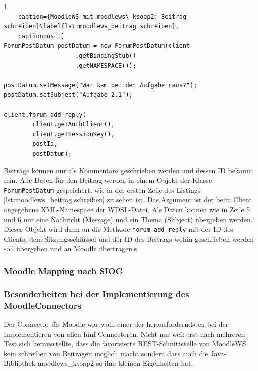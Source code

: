 \begin{lstlisting}[
    caption={MoodleWS mit moodlews\_ksoap2: Beitrag schreiben}\label{lst:moodlews_beitrag schreiben},
    captionpos=t]
ForumPostDatum postDatum = new ForumPostDatum(client
                    .getBindingStub()
                    .getNAMESPACE());

postDatum.setMessage("War kam bei der Aufgabe raus?");
postDatum.setSubject("Aufgabe 2.1");

client.forum_add_reply(
        client.getAuthClient(),
        client.getSessionKey(),
        postId,
        postDatum);
\end{lstlisting}

Beiträge können nur als Kommentare geschrieben werden und dessen ID bekannt sein. Alle Daten für den Beitrag werden in einem Objekt der Klasse \texttt{ForumPostDatum} gespeichert, wie in der ersten Zeile des Listings \ref{lst:moodlews_beitrag schreiben} zu sehen ist. Das Argument ist der beim Client angegebene XML-Namespace der WDSL-Datei. Als Daten können wie in Zeile 5 und 6 nur eine Nachricht (Message) und ein Thema (Subject) übergeben werden. Dieses Objekt wird dann an die Methode \texttt{forum\_add\_reply} mit der ID des Clients, dem Sitzungsschlüssel und der ID des Beitrags wohin geschrieben werden soll übergeben und an Moodle übertragen.s


\subsubsection{Moodle Mapping nach SIOC} %
\label{ssub:moodle_mapping_nach_sioc}




\subsubsection{Besonderheiten bei der Implementierung des MoodleConnectors} %
\label{ssub:herausforderungen_bei_der_implementierung_des_moodleconnectors}

Der Connector für Moodle war wohl einer der herausforderndsten bei der Implementieren von allen fünf Connectoren. Nicht nur weil erst nach mehreren Test sich herausstellte, dass die favorisierte REST-Schnittstelle von MoodleWS kein schreiben von Beiträgen möglich macht sondern dass auch die Java-Bibliothek moodlews\_ksoap2 so ihre kleinen Eigenheiten hat. 

